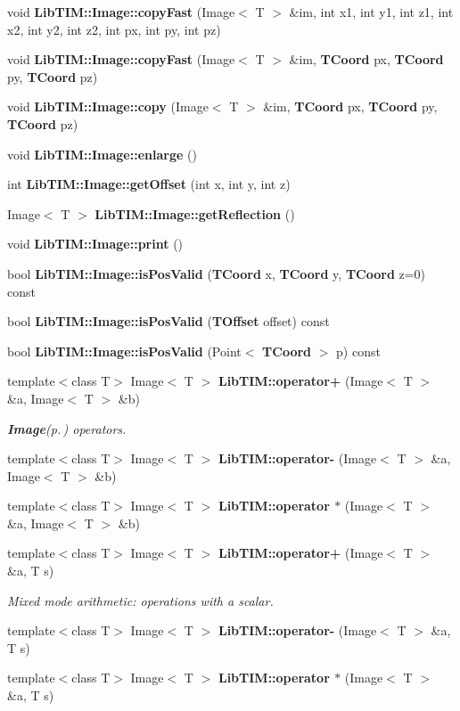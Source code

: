\begin{CompactItemize}
\item 
void {\bf Lib\-TIM::Image::copy\-Fast} (Image$<$ T $>$ \&im, int x1, int y1, int z1, int x2, int y2, int z2, int px, int py, int pz)
\item 
void {\bf Lib\-TIM::Image::copy\-Fast} (Image$<$ T $>$ \&im, {\bf TCoord} px, {\bf TCoord} py, {\bf TCoord} pz)
\item 
void {\bf Lib\-TIM::Image::copy} (Image$<$ T $>$ \&im, {\bf TCoord} px, {\bf TCoord} py, {\bf TCoord} pz)
\item 
void {\bf Lib\-TIM::Image::enlarge} ()
\item 
int {\bf Lib\-TIM::Image::get\-Offset} (int x, int y, int z)
\item 
Image$<$ T $>$ {\bf Lib\-TIM::Image::get\-Reflection} ()
\item 
void {\bf Lib\-TIM::Image::print} ()
\item 
bool {\bf Lib\-TIM::Image::is\-Pos\-Valid} ({\bf TCoord} x, {\bf TCoord} y, {\bf TCoord} z=0) const 
\item 
bool {\bf Lib\-TIM::Image::is\-Pos\-Valid} ({\bf TOffset} offset) const 
\item 
bool {\bf Lib\-TIM::Image::is\-Pos\-Valid} (Point$<$ {\bf TCoord} $>$ p) const 
\item 
template$<$class T$>$ Image$<$ T $>$ {\bf Lib\-TIM::operator+} (Image$<$ T $>$ \&a, Image$<$ T $>$ \&b)
\begin{CompactList}\small\item\em {\bf Image}{\rm (p.\,\pageref{classLibTIM_1_1Image})} operators. \item\end{CompactList}\item 
template$<$class T$>$ Image$<$ T $>$ {\bf Lib\-TIM::operator-} (Image$<$ T $>$ \&a, Image$<$ T $>$ \&b)
\item 
template$<$class T$>$ Image$<$ T $>$ {\bf Lib\-TIM::operator $\ast$} (Image$<$ T $>$ \&a, Image$<$ T $>$ \&b)
\item 
template$<$class T$>$ Image$<$ T $>$ {\bf Lib\-TIM::operator+} (Image$<$ T $>$ \&a, T s)
\begin{CompactList}\small\item\em Mixed mode arithmetic: operations with a scalar. \item\end{CompactList}\item 
template$<$class T$>$ Image$<$ T $>$ {\bf Lib\-TIM::operator-} (Image$<$ T $>$ \&a, T s)
\item 
template$<$class T$>$ Image$<$ T $>$ {\bf Lib\-TIM::operator $\ast$} (Image$<$ T $>$ \&a, T s)
\end{CompactItemize}


